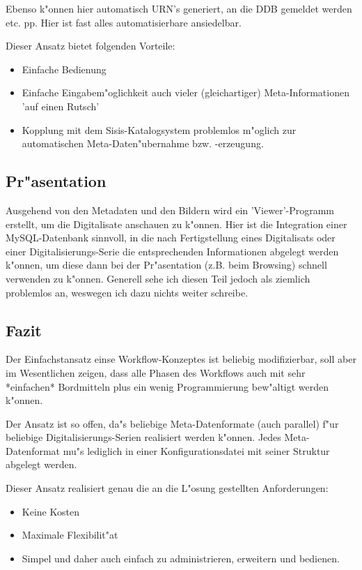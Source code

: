 \documentclass[11pt, twoside, a4paper, BCOR8mm, DIV12, bibtotoc,idxtotoc]{scrreprt}
\begin{document}
Ebenso k"onnen hier automatisch URN's generiert, an die DDB gemeldet werden
etc. pp. Hier ist fast alles automatisierbare ansiedelbar.

Dieser Ansatz bietet folgenden Vorteile:

\begin{itemize}
\item Einfache Bedienung
\item Einfache Eingabem"oglichkeit auch vieler (gleichartiger)
Meta-Informationen 'auf einen Rutsch'
\item Kopplung mit dem Sisis-Katalogsystem problemlos m"oglich zur
automatischen Meta-Daten\-"uber\-nahme bzw. -er\-zeugung.
\end{itemize}


\subsection{Pr"asentation}

Ausgehend von den Metadaten und den Bildern wird ein
'Viewer'-Programm erstellt, um die Digitalisate anschauen zu
k"onnen. Hier ist die Integration einer MySQL-Datenbank sinnvoll, in
die nach Fertigstellung eines Digitalisats oder einer
Digitalisie\-rungs-Serie die entsprechenden Informationen abgelegt
werden k"onnen, um diese dann bei der Pr"asentation (z.B. beim
Browsing) schnell verwenden zu k"onnen. Generell
sehe ich diesen Teil jedoch als ziemlich problemlos an, weswegen ich dazu nichts weiter
schreibe.


\subsection{Fazit}

Der Einfachstansatz einse Workflow-Konzeptes ist beliebig
modifizierbar, soll aber im Wesentlichen zeigen, dass alle Phasen des
Workflows auch mit sehr *einfachen* Bordmitteln plus ein wenig
Programmierung bew"altigt werden k"onnen.

Der Ansatz ist so offen, da"s beliebige Meta-Datenformate (auch
parallel) f"ur beliebige Digitalisierungs-Serien realisiert werden
k"onnen. Jedes Meta-Datenformat mu"s lediglich in einer
Konfigurationsdatei mit seiner Struktur abgelegt werden.

Dieser Ansatz realisiert genau die an die L"osung gestellten
Anforderungen:

\begin{itemize}
\item Keine Kosten
\item Maximale Flexibilit"at
\item Simpel und daher auch einfach zu administrieren, erweitern und bedienen.
\end{itemize}
\end{document}

